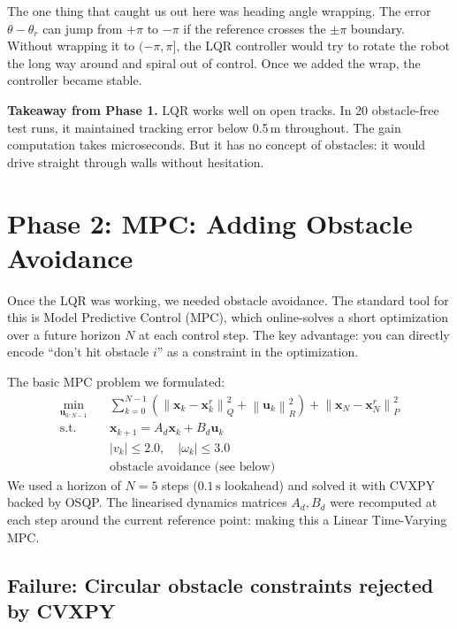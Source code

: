 \documentclass[12pt,a4paper]{article}
\newcommand{\norm}[1]{\left\lVert#1\right\rVert}
\begin{document}
The one thing that caught us out here was heading angle wrapping. The error
$\theta - \theta_r$ can jump from $+\pi$ to $-\pi$ if the reference crosses
the $\pm\pi$ boundary. Without wrapping it to $(-\pi, \pi]$, the LQR
controller would try to rotate the robot the long way around and spiral
out of control. Once we added the wrap, the controller became stable.

\begin{insight}
\textbf{Takeaway from Phase 1.} LQR works well on open tracks. In 20
obstacle-free test runs, it maintained tracking error below 0.5\,m
throughout. The gain computation takes microseconds. But it has no
concept of obstacles: it would drive straight through walls without
hesitation.
\end{insight}

\section{Phase 2: MPC: Adding Obstacle Avoidance}

Once the LQR was working, we needed obstacle avoidance. The standard tool
for this is Model Predictive Control (MPC), which online-solves a short
optimization over a future horizon $N$ at each control step. The key
advantage: you can directly encode ``don't hit obstacle $i$'' as a
constraint in the optimization.

The basic MPC problem we formulated:
\begin{align}
  \min_{\mathbf{u}_{0:N-1}} \quad &
    \sum_{k=0}^{N-1} \left( \norm{\mathbf{x}_k - \mathbf{x}^r_k}_Q^2
    + \norm{\mathbf{u}_k}_R^2 \right)
    + \norm{\mathbf{x}_N - \mathbf{x}^r_N}_P^2 \\
  \text{s.t.} \quad &
    \mathbf{x}_{k+1} = A_d \mathbf{x}_k + B_d \mathbf{u}_k \\
  & |v_k| \leq 2.0, \quad |\omega_k| \leq 3.0 \\
  & \text{obstacle avoidance (see below)}
\end{align}
We used a horizon of $N = 5$ steps ($0.1\,\text{s}$ lookahead) and solved
it with CVXPY backed by OSQP. The linearised dynamics matrices $A_d, B_d$
were recomputed at each step around the current reference point: making
this a Linear Time-Varying MPC.

\subsection{Failure: Circular obstacle constraints rejected by CVXPY}
\end{document}
